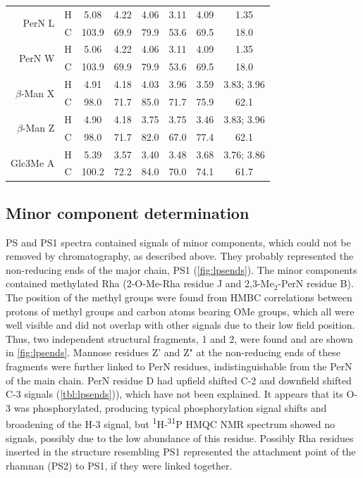 \begin{table}[hp]
\begin{tabular}{@{}rccccccc@{}}
				\multirow{2}{*}{PerN L}        & H & 5.08  & 4.22 & 4.06 & 3.11 & 4.09 & 1.35 \\
     & C & 103.9 & 69.9 & 79.9 & 53.6 & 69.5 & 18.0 \\
				\multirow{2}{*}{PerN W}        & H & 5.06  & 4.22 & 4.06 & 3.11 & 4.09 & 1.35 \\
     & C & 103.9 & 69.9 & 79.9 & 53.6 & 69.5 & 18.0 \\
				\multirow{2}{*}{$\beta$-Man X} & H & 4.91  & 4.18 & 4.03 & 3.96 & 3.59 & 3.83; 3.96 \\
     & C & 98.0  & 71.7 & 85.0 & 71.7 & 75.9 & 62.1 \\
				\multirow{2}{*}{$\beta$-Man Z} & H & 4.90  & 4.18 & 3.75 & 3.75 & 3.46 & 3.83; 3.96 \\
     & C & 98.0  & 71.7 & 82.0 & 67.0 & 77.4 & 62.1 \\
				\multirow{2}{*}{Glc3Me A}      & H & 5.39  & 3.57 & 3.40 & 3.48 & 3.68 & 3.76; 3.86 \\
     & C & 100.2 & 72.2 & 84.0 & 70.0 & 74.1 & 61.7 \\ \bottomrule
			\end{tabular}
		\end{table}
  
	\subsection{Minor component determination} %
	\label{sub:minor_component_determination}

  \ac{PS} and \ac{PS}1 spectra contained signals of minor components, which could not be removed by
  chromatography, as described above. They probably represented the non-reducing ends of the major
  chain, \ac{PS}1 (\cref{fig:lpsends}). The minor components contained methylated Rha (2-O-Me-Rha
  residue J and 2,3-Me$_2$-PerN residue B). The position of the methyl groups were found from
  \ac{HMBC} correlations between protons of methyl groups and carbon atoms bearing OMe groups, which
  all were well visible and did not overlap with other signals due to their low field
  position. Thus, two independent structural fragments, 1 and 2, were found and are shown in
  \cref{fig:lpsends}. Mannose residues Z' and Z" at the non-reducing ends of these fragments were
  further linked to PerN residues, indistinguishable from the PerN of the main chain. PerN residue D
  had upfield shifted C-2 and downfield shifted C-3 signals (\cref{tbl:lpsends})), which have not
  been explained. It appears that its O-3 was phosphorylated, producing typical phosphorylation
  signal shifts and broadening of the H-3 signal, but \textsuperscript{1}H-\textsuperscript{31}P
  \ac{HMQC} \ac{NMR} spectrum showed no signals, possibly due to the low abundance of this
  residue. Possibly Rha residues inserted in the structure resembling \ac{PS}1 represented the
  attachment point of the rhamnan (\ac{PS}2) to \ac{PS}1, if they were linked together.

